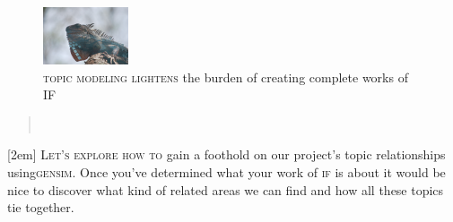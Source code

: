 \begin{figure}[h]                                                           
 \includegraphics[width=0.95\linewidth]{./media/images/world_iguana}%
  \scriptsize{\textsc{\\topic modeling lightens} the burden of creating complete works of IF}
  \label{fig:editorial}%
\end{figure}                                                                

\begin{quotation} 
  \noindent{}\\[.5mm]
   \hfill{}
\end{quotation} 
\newpage
{}[2em]
\lettrine[lines=3]{\color{BrickRed}L}{\enspace et's explore how to}
gain a foothold on our project's topic relationships
using\textsc{gensim}. Once you've determined what your work of \textsc{if} is about
it would be nice to discover what kind of related areas we can find and how all these topics tie together.

